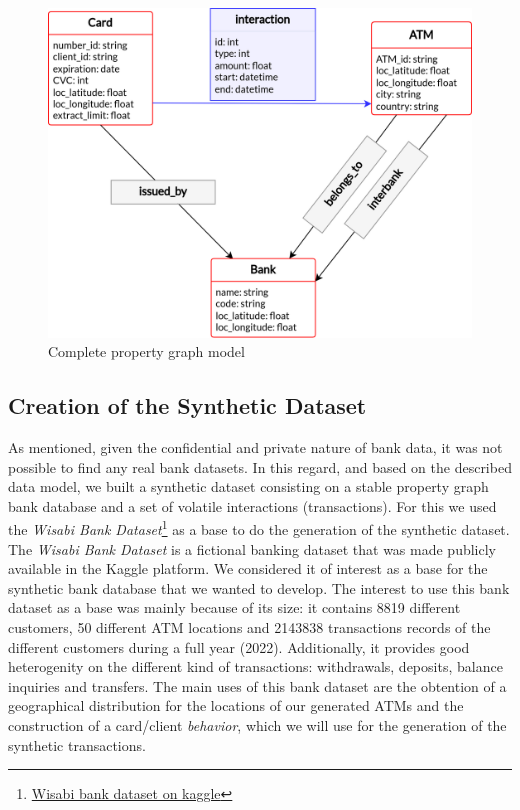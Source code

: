 \documentclass{article}
\begin{document}
\begin{figure}[H]
  \centering
  \includegraphics[scale = 0.7]{images/schema-complete.png}
  \caption{Complete property graph model}
  \label{img:pg-complete}
\end{figure}

\subsection{Creation of the Synthetic Dataset}

As mentioned, given the confidential and private nature of bank data, it was not possible to find any real bank datasets. In this regard, and based on the described data model, we built a synthetic dataset consisting on a stable property graph bank database and a set of volatile interactions (transactions).
For this we used the \emph{Wisabi Bank Dataset}\footnote{\href{https://www.kaggle.com/datasets/obinnaiheanachor/wisabi-bank-dataset}{Wisabi bank dataset on kaggle}} as a base to do the generation of the synthetic dataset. The \emph{Wisabi Bank Dataset} is a fictional banking dataset that was made publicly available in the Kaggle platform. We considered it of interest as a base for the synthetic bank
database that we wanted to develop. The interest to use this bank dataset as a base was mainly because of its size: it contains 8819 different customers, 50 different ATM locations and 2143838 transactions records of the different customers during a full year (2022). Additionally, it provides good heterogenity on the different kind of transactions: withdrawals, deposits, balance inquiries and transfers. The main uses of this bank dataset are the obtention of a geographical distribution for
the locations of our generated ATMs and the construction of a card/client \emph{behavior}, which we will use for the generation of the synthetic transactions.
\end{document}
